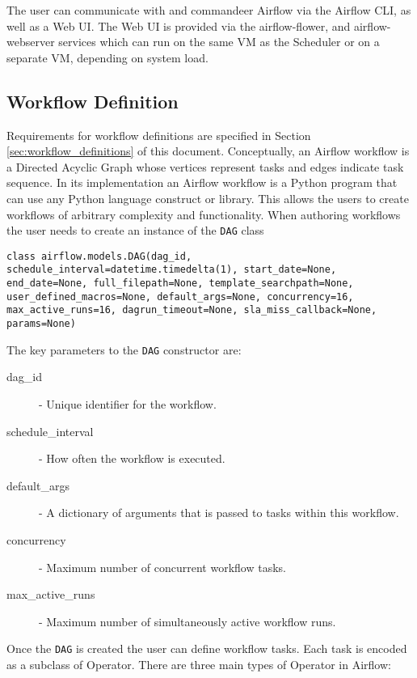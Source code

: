 The user can communicate with and commandeer Airflow via the Airflow CLI, as well as a Web UI. The Web UI is provided via the airflow-flower, and airflow-webserver services which can run on the same VM as the Scheduler or on a separate VM, depending on system load.
 
\subsection{Workflow Definition}

Requirements for workflow definitions are specified in Section \ref{sec:workflow_definitions} of this document. Conceptually, an Airflow workflow is a Directed Acyclic Graph whose vertices represent tasks and edges indicate task sequence. In its implementation an Airflow workflow is a Python program that can use any Python language construct or library. This allows the users to create workflows of arbitrary complexity and functionality.
\newpage
When authoring workflows the user needs to create an instance of the \texttt{DAG} class

\begin{verbatim}
class airflow.models.DAG(dag_id, schedule_interval=datetime.timedelta(1), start_date=None, end_date=None, full_filepath=None, template_searchpath=None, user_defined_macros=None, default_args=None, concurrency=16, max_active_runs=16, dagrun_timeout=None, sla_miss_callback=None, params=None)
\end{verbatim}

The key parameters to the \texttt{DAG} constructor are:

\begin{description}
\item [dag\_id] - Unique identifier for the workflow.
\item [schedule\_interval] - How often the workflow is executed.
\item [default\_args] - A dictionary of arguments that is passed to tasks within this workflow.
\item [concurrency] - Maximum number of concurrent workflow tasks.
\item [max\_active\_runs] - Maximum number of simultaneously active workflow runs.
\end{description}

Once the \texttt{DAG} is created the user can define workflow tasks. Each task is encoded as a subclass of Operator. There are three main types of Operator in Airflow:

